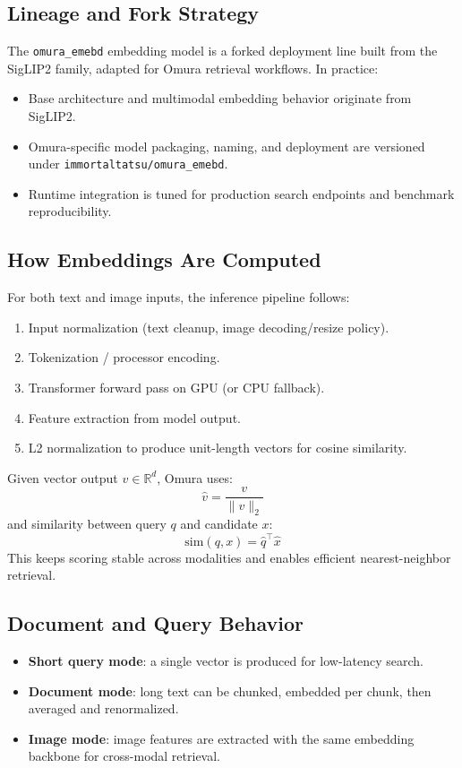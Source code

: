 \documentclass[11pt]{article}
\begin{document}
\subsection{Lineage and Fork Strategy}
The \texttt{omura\_emebd} embedding model is a forked deployment line built from
the SigLIP2 family, adapted for Omura retrieval workflows. In practice:
\begin{itemize}[leftmargin=1.2em]
  \item Base architecture and multimodal embedding behavior originate from SigLIP2.
  \item Omura-specific model packaging, naming, and deployment are versioned under
  \texttt{immortaltatsu/omura\_emebd}.
  \item Runtime integration is tuned for production search endpoints and benchmark reproducibility.
\end{itemize}

\subsection{How Embeddings Are Computed}
For both text and image inputs, the inference pipeline follows:
\begin{enumerate}[leftmargin=1.2em]
  \item Input normalization (text cleanup, image decoding/resize policy).
  \item Tokenization / processor encoding.
  \item Transformer forward pass on GPU (or CPU fallback).
  \item Feature extraction from model output.
  \item L2 normalization to produce unit-length vectors for cosine similarity.
\end{enumerate}

Given vector output \(v \in \mathbb{R}^{d}\), Omura uses:
\[
\hat{v} = \frac{v}{\|v\|_2}
\]
and similarity between query \(q\) and candidate \(x\):
\[
\mathrm{sim}(q, x) = \hat{q}^{\top}\hat{x}
\]
This keeps scoring stable across modalities and enables efficient nearest-neighbor retrieval.

\subsection{Document and Query Behavior}
\begin{itemize}[leftmargin=1.2em]
  \item \textbf{Short query mode}: a single vector is produced for low-latency search.
  \item \textbf{Document mode}: long text can be chunked, embedded per chunk, then averaged and renormalized.
  \item \textbf{Image mode}: image features are extracted with the same embedding backbone for cross-modal retrieval.
\end{itemize}
\end{document}
